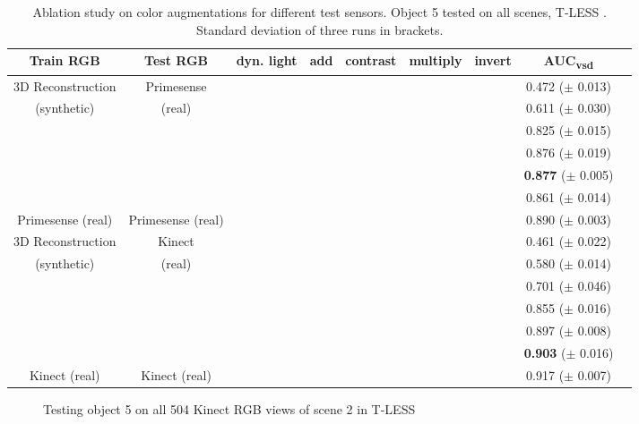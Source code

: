 \begin{table*}[t]
	\centering
	\scriptsize
	\captionsetup{justification=centering,width=.8\textwidth}
	\caption{Ablation study on color augmentations for different test sensors. Object 5 tested on all scenes, T-LESS \cite{hodan2017tless}. Standard deviation of three runs in brackets.}
	\begin{adjustbox}{max width=.8\textwidth}
		\begin{tabular}{ccccccccc}
			\toprule
			\textbf{Train RGB} & \textbf{Test RGB}
			& dyn. light & add & contrast & multiply & invert & \textbf{AUC\textsubscript{vsd}}\\
			\midrule
			3D Reconstruction & Primesense &  \OK  &  &  &  &  & 0.472 ($\pm$ 0.013)\\
			(synthetic)& (real) & \OK  & \OK &  &  &   & 0.611 ($\pm$ 0.030)\\
			&& \OK  & \OK & \OK &  &  & 0.825 ($\pm$ 0.015)\\
			&& \OK  & \OK & \OK &  \OK&   & 0.876 ($\pm$ 0.019)\\
			&& \OK  & \OK & \OK &  \OK&  \OK & \textbf{0.877} ($\pm$ 0.005)\\
			&&    & \OK & \OK &  \OK&  & 0.861 ($\pm$ 0.014)\\   
			\midrule
			Primesense (real) & Primesense (real) & & \OK & \OK &  \OK& & 0.890 ($\pm$ 0.003)\\
			\midrule
			3D Reconstruction&Kinect &  \OK  &  &  &  &  & 0.461 ($\pm$ 0.022)\\
			(synthetic)&(real) &  \OK  & \OK &  &  &   & 0.580 ($\pm$ 0.014)\\
			&&  \OK  & \OK & \OK &  &  & 0.701 ($\pm$ 0.046)\\
			&&  \OK  & \OK & \OK &  \OK&   & 0.855 ($\pm$ 0.016)\\
			&&  \OK  & \OK & \OK &  \OK&  \OK & 0.897 ($\pm$ 0.008)\\
			&&    & \OK & \OK &  \OK&   & \textbf{0.903} ($\pm$ 0.016)\\
			\midrule
			Kinect (real)& Kinect (real) & & \OK & \OK &  \OK& & 0.917 ($\pm$ 0.007)\\
		\end{tabular}
	\end{adjustbox}
	\label{tab:auc_aug}
\end{table*}
\begin{figure*}[t]

	\centering
	
	 \qquad
	\captionsetup{}
	\caption{Testing object 5 on all 504 Kinect RGB views of scene 2 in T-LESS}
	
\end{figure*}

